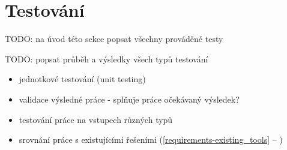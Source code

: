 \chapter{Testování}

TODO: na úvod této sekce popsat všechny prováděné testy

\noindent
TODO: popsat průběh a výsledky všech typů testování

\begin{itemize}
\item jednotkové testování (unit testing)
\item validace výsledné práce - splňuje práce očekávaný výsledek?
\item testování práce na vstupech různých typů
\item srovnání práce s existujícími řešeními (\ref{requirements-existing_tools} -- )
\end{itemize}
